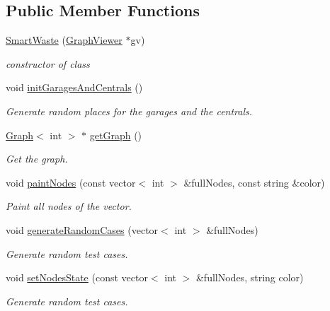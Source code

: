 \subsection*{Public Member Functions}
\begin{DoxyCompactItemize}
\item 
\hyperlink{classSmartWaste_a9160cb643ea818e93ac5f129ca753372}{Smart\+Waste} (\hyperlink{classGraphViewer}{Graph\+Viewer} $\ast$gv)
\begin{DoxyCompactList}\small\item\em constructor of class \end{DoxyCompactList}\item 
void \hyperlink{classSmartWaste_ae42e3c99877f4651f931a68c34526398}{init\+Garages\+And\+Centrals} ()
\begin{DoxyCompactList}\small\item\em Generate random places for the garages and the centrals. \end{DoxyCompactList}\item 
\hyperlink{classGraph}{Graph}$<$ int $>$ $\ast$ \hyperlink{classSmartWaste_a01f8a0d4c232b6e25c8a31299cbfd3ea}{get\+Graph} ()
\begin{DoxyCompactList}\small\item\em Get the graph. \end{DoxyCompactList}\item 
void \hyperlink{classSmartWaste_a418a6bbfd147448293d26f8269a52a7a}{paint\+Nodes} (const vector$<$ int $>$ \&full\+Nodes, const string \&color)
\begin{DoxyCompactList}\small\item\em Paint all nodes of the vector. \end{DoxyCompactList}\item 
void \hyperlink{classSmartWaste_ac22248b6006d50c9a5a4c930fcdde56e}{generate\+Random\+Cases} (vector$<$ int $>$ \&full\+Nodes)
\begin{DoxyCompactList}\small\item\em Generate random test cases. \end{DoxyCompactList}\item 
void \hyperlink{classSmartWaste_aeefe2c284d3a3a83589a0a3118af0f05}{set\+Nodes\+State} (const vector$<$ int $>$ \&full\+Nodes, string color)
\begin{DoxyCompactList}\small\item\em Generate random test cases. \end{DoxyCompactList}\item 

\end{DoxyCompactItemize}

